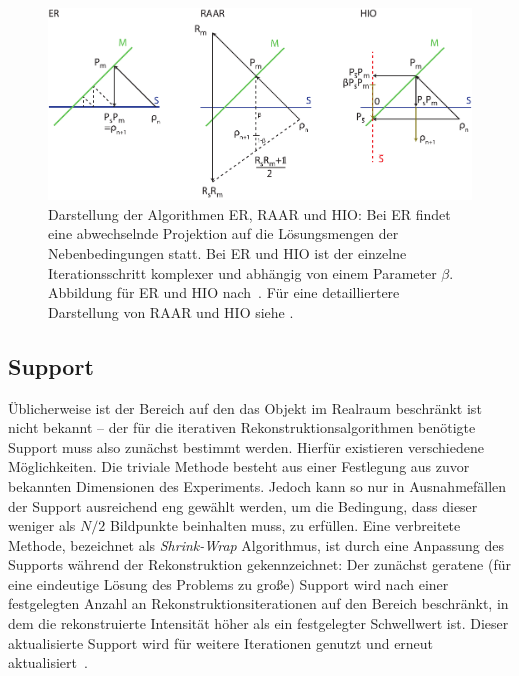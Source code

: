 \begin{figure}
	\centering
	\includegraphics[width=1\textwidth]{images/algorithmen.pdf}
	\caption[Rekonstruktionsalgorithmen]{Darstellung der Algorithmen ER, RAAR und HIO: Bei ER findet eine abwechselnde Projektion auf die Lösungsmengen der Nebenbedingungen statt. Bei ER und HIO ist der einzelne Iterationsschritt komplexer und abhängig von einem Parameter $\beta$. Abbildung für ER und HIO nach~\cite{marchesini2007}. Für eine detailliertere Darstellung von RAAR und HIO siehe .}
	\label{fig:recon}
\end{figure} 
\subsection{Support}
Üblicherweise ist der Bereich auf den das Objekt im Realraum beschränkt ist nicht bekannt -- der für die iterativen Rekonstruktionsalgorithmen benötigte Support muss also zunächst bestimmt werden. Hierfür existieren verschiedene Möglichkeiten. Die triviale Methode besteht aus einer Festlegung aus zuvor bekannten Dimensionen des Experiments. Jedoch kann so nur in Ausnahmefällen der Support ausreichend eng gewählt werden, um die Bedingung, dass dieser weniger als $N/2$ Bildpunkte beinhalten muss, zu erfüllen.
Eine verbreitete Methode, bezeichnet als \textit{Shrink-Wrap} Algorithmus, ist durch eine Anpassung des Supports während der Rekonstruktion gekennzeichnet: Der zunächst geratene (für eine eindeutige Lösung des Problems  zu große) Support wird nach einer festgelegten Anzahl an Rekonstruktionsiterationen auf den Bereich beschränkt, in dem die rekonstruierte Intensität höher als ein festgelegter Schwellwert ist. Dieser aktualisierte Support wird für weitere Iterationen genutzt und erneut aktualisiert~\cite{marchesini2003}.

